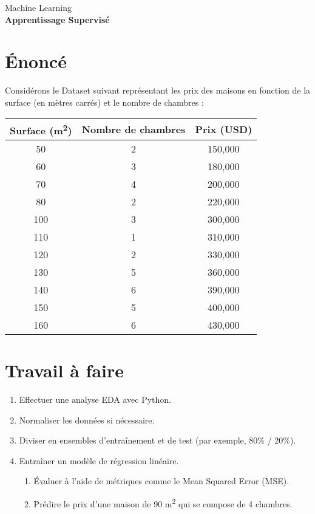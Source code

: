 



\begin{center}


\end{center}


\begin{center}
	Machine Learning \\
	\textbf{Apprentissage Supervisé }
\end{center}



\section*{Énoncé}
Considérons le Dataset suivant représentant les prix des maisons en fonction de la surface (en mètres carrés) et le nombre de chambres :

\begin{center}
	\begin{tabular}{|c|c|c|}
		\hline
		\textbf{Surface (m\textsuperscript{2})} & \textbf{Nombre de chambres} & \textbf{Prix (USD)} \\
		\hline
		50 & 2 & 150,000 \\
		60 & 3 & 180,000 \\
		70 & 4 & 200,000 \\
		80 & 2 & 220,000 \\
		100 & 3 & 300,000 \\
		110 & 1 & 310,000 \\
		120 & 2 & 330,000 \\
		130 & 5 & 360,000 \\
		140 & 6 & 390,000 \\
		150 & 5 & 400,000 \\
		160 & 6 & 430,000 \\
		\hline
	\end{tabular}
\end{center}

\section*{Travail à faire}

\begin{enumerate}


\item  Effectuer une analyse EDA avec Python.
\item  Normaliser les données si nécessaire.
\item Diviser en ensembles d'entraînement et de test (par exemple, 80\% / 20\%).
\item Entraîner un modèle de régression linéaire.
\begin{enumerate}
\item Évaluer à l'aide de métriques comme le Mean Squared Error (MSE).
\item Prédire le prix d'une maison de 90 m\textsuperscript{2} qui se compose de 4 chambres.
\end{enumerate}
\end{enumerate}


